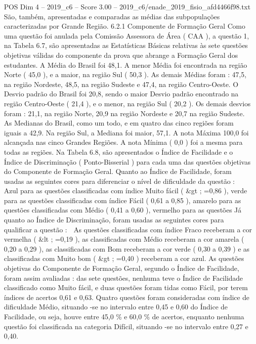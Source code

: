 \begin{textsample}{POS Dim 4 – 2019\_c6 – Score 3.00 – 2019\_c6/enade\_2019\_fisio\_afd4466f98.txt}
São, também, apresentadas e comparadas as médias das subpopulações caracterizadas por Grande Região. 6.2.1 Componente de Formação Geral Como uma questão foi anulada pela Comissão Assessora de Área ( CAA ), a questão 1, na Tabela 6.7, são apresentadas as Estatísticas Básicas relativas às sete questões objetivas válidas do componente da prova que abrange a Formação Geral dos estudantes.
A Média do Brasil foi 48,1.
A menor Média foi encontrada na região Norte ( 45,0 ), e a maior, na região Sul ( 50,3 ).
As demais Médias foram : 47,5, na região Nordeste, 48,5, na região Sudeste e 47,4, na região Centro-Oeste.
O Desvio padrão do Brasil foi 20,8, sendo o maior Desvio padrão encontrado na região Centro-Oeste ( 21,4 ), e o menor, na região Sul ( 20,2 ).
Os demais desvios foram : 21,1, na região Norte, 20,9 na região Nordeste e 20,7 na região Sudeste.
As Medianas do Brasil, como um todo, e em quatro das cinco regiões foram iguais a 42,9.
Na região Sul, a Mediana foi maior, 57,1.
A nota Máxima 100,0 foi alcançada nas cinco Grandes Regiões.
A nota Mínima ( 0,0 ) foi a mesma para todas as regiões.
Na Tabela 6.8, são apresentados o Índice de Facilidade e o Índice de Discriminação ( Ponto-Bisserial ) para cada uma das questões objetivas do Componente de Formação Geral.
Quanto ao Índice de Facilidade, foram usadas as seguintes cores para diferenciar o nível de dificuldade da questão :  Azul para as questões classificadas com índice Muito fácil ( \&gt ; =0,86 ), verde para as questões classificadas com índice Fácil ( 0,61 a 0,85 ), amarelo para as questões classificadas com Médio ( 0,41 a 0,60 ), vermelho para as questões Já quanto ao Índice de Discriminação, foram usadas as seguintes cores para qualificar a questão :  As questões classificadas com índice Fraco receberam a cor vermelha ( \&lt ; =0,19 ), as classificadas com Médio receberam a cor amarela ( 0,20 a 0,29 ), as classificadas com Bom receberam a cor verde ( 0,30 a 0,39 ) e as classificadas com Muito bom ( \&gt ; =0,40 ) receberam a cor azul.
As questões objetivas do Componente de Formação Geral, segundo o Índice de Facilidade, foram assim avaliadas : das sete questões, nenhuma teve o Índice de Facilidade classificado como Muito fácil, e duas questões foram tidas como Fácil, por terem índices de acertos 0,61 e 0,63.
Quatro questões foram consideradas com índice de dificuldade Médio, situando -se no intervalo entre 0,45 e 0,60 do Índice de Facilidade, ou seja, houve entre 45,0 \% e 60,0 \% de acertos, enquanto nenhuma questão foi classificada na categoria Difícil, situando -se no intervalo entre 0,27 e 0,40.

\end{textsample}
